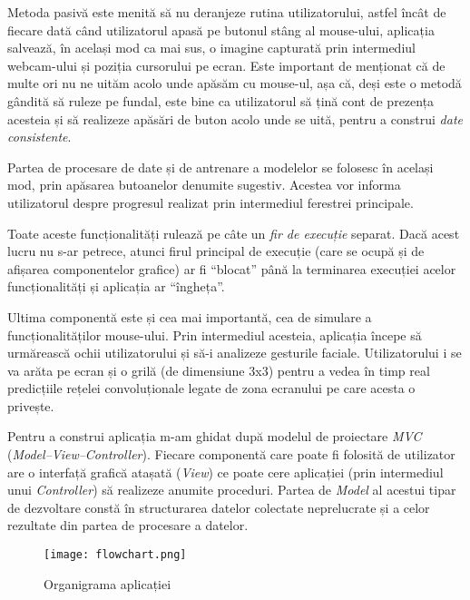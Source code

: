 Metoda pasivă este menită să nu deranjeze rutina utilizatorului, astfel încât de fiecare dată când utilizatorul apasă pe butonul stâng al mouse-ului, aplicația salvează, în același mod ca mai sus, o imagine capturată prin intermediul webcam-ului și poziția cursorului pe ecran.
Este important de menționat că de multe ori nu ne uităm acolo unde apăsăm cu mouse-ul, așa că, deși este o metodă gândită să ruleze pe fundal, este bine ca utilizatorul să țină cont de prezența acesteia și să realizeze apăsări de buton acolo unde se uită, pentru a construi \emph{date consistente}.

Partea de procesare de date și de antrenare a modelelor se folosesc în același mod, prin apăsarea butoanelor denumite sugestiv.
Acestea vor informa utilizatorul despre progresul realizat prin intermediul ferestrei principale.

Toate aceste funcționalități rulează pe câte un \emph{fir de execuție} separat.
Dacă acest lucru nu s-ar petrece, atunci firul principal de execuție (care se ocupă și de afișarea componentelor grafice) ar fi ``blocat'' până la terminarea execuției acelor funcționalități și aplicația ar ``îngheța''.

Ultima componentă este și cea mai importantă, cea de simulare a funcționalităților mouse-ului.
Prin intermediul acesteia, aplicația începe să urmărească ochii utilizatorului și să-i analizeze gesturile faciale.
Utilizatorului i se va arăta pe ecran și o grilă (de dimensiune 3x3) pentru a vedea în timp real predicțiile rețelei convoluționale legate de zona ecranului pe care acesta o privește.

Pentru a construi aplicația m-am ghidat după modelul de proiectare \emph{MVC} (\emph{Model–View–Controller}).
Fiecare componentă care poate fi folosită de utilizator are o interfață grafică atașată (\emph{View}) ce poate cere aplicației (prin intermediul unui \emph{Controller}) să realizeze anumite proceduri.
Partea de \emph{Model} al acestui tipar de dezvoltare constă în structurarea datelor colectate neprelucrate și a celor rezultate din partea de procesare a datelor.

\begin{figure}[ht]
    \centering
    \texttt{[image: flowchart.png]}
    \caption{Organigrama aplicației}
\end{figure}
